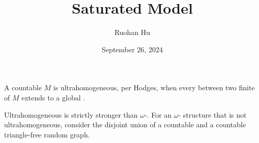 \documentclass[a4paper]{article}
\title{Saturated Model}
\date{September 26, 2024}
\author{Ruohan Hu}
\begin{document}
\maketitle
\par{
    A countable  \(M\) is ultrahomogeneous, per Hodges, when every  between two finite  of \(M\) extends to a global .

    Ultrahomogeneous is strictly stronger than \(\omega\)-. For an \(\omega\)- structure that is not ultrahomogeneous, consider the disjoint union of a countable  and a countable triangle-free random graph.
}
\printbibliography
\end{document}
